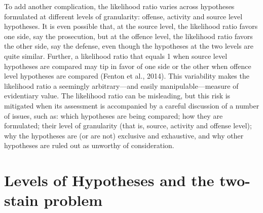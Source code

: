 \documentclass[10pt,dvipsnames,enabledeprecatedfontcommands]{scrartcl}
\begin{document}
To add another complication, the likelihood ratio varies across
hypotheses formulated at different levels of granularity: offense,
activity and source level hypotheses. It is even possible that, at the
source level, the likelihood ratio favors one side, say the prosecution,
but at the offence level, the likelihood ratio favors the other side,
say the defense, even though the hypotheses at the two levels are quite
similar. Further, a likelihood ratio that equals 1 when source level
hypotheses are compared may tip in favor of one side or the other when
offence level hypotheses are compared (Fenton et al., 2014). This
variability makes the likelihood ratio a seemingly arbitrary---and
easily manipulable---measure of evidentiary value. The likelihood ratio
can be misleading, but this risk is mitigated when its assessment is
accompanied by a careful discussion of a number of issues, such as:
which hypotheses are being compared; how they are formulated; their
level of granularity (that is, source, activity and offense level); why
the hypotheses are (or are not) exclusive and exhaustive, and why other
hypotheses are ruled out as unworthy of consideration.


\section{\texorpdfstring{Levels of Hypotheses and the two-stain problem
\label{sec:lhTwoSTain}}{Levels of Hypotheses and the two-stain problem }}\label{levels-of-hypotheses-and-the-two-stain-problem}

\end{document}
